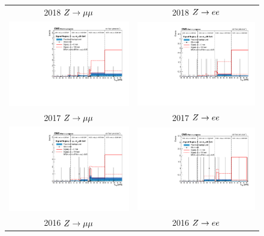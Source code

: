 \begin{figure}[htb!]
	\centering
	\begin{tabular}{c c}
		2018 $\VZ\to\mu\mu$ & 2018 $\VZ\to ee$\\
		\includegraphics[width=0.45\linewidth]{figs/05_analysis/closure_ZH_MU_m20_data_2018.pdf} &
		\includegraphics[width=0.45\linewidth]{figs/05_analysis/closure_ZH_ELE_m20_data_2018.pdf} \\
		2017 $\VZ\to\mu\mu$ & 2017 $\VZ\to ee$\\
		\includegraphics[width=0.45\linewidth]{figs/05_analysis/closure_ZH_MU_m20_data_2017.pdf} &
		\includegraphics[width=0.45\linewidth]{figs/05_analysis/closure_ZH_ELE_m20_data_2017.pdf} \\
		2016 $\VZ\to\mu\mu$ & 2016 $\VZ\to ee$\\

\end{tabular}
\end{figure}
